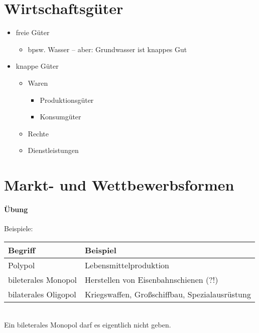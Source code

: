 \section{Wirtschaftsgüter}
\begin{itemize}
\item freie Güter
\begin{itemize}
\item bpsw. Wasser -- aber: Grundwasser ist knappes Gut
\end{itemize}
\item knappe Güter
\begin{itemize}
\item Waren
\begin{itemize}
\item Produktionsgüter
\item Konsumgüter
\end{itemize}
\item Rechte
\item Dienstleistungen
\end{itemize}
\end{itemize}

\section{Markt- und Wettbewerbsformen}
\paragraph{Übung} Beispiele:\\
\begin{tabular}{l l}
Begriff & Beispiel\\
\hline
Polypol & Lebensmittelproduktion\\
bileterales Monopol & Herstellen von Eisenbahnschienen (?!)\\
bilaterales Oligopol & Kriegswaffen, Großschiffbau, Spezialausrüstung
\end{tabular}\\
Ein bileterales Monopol darf es eigentlich nicht geben.

